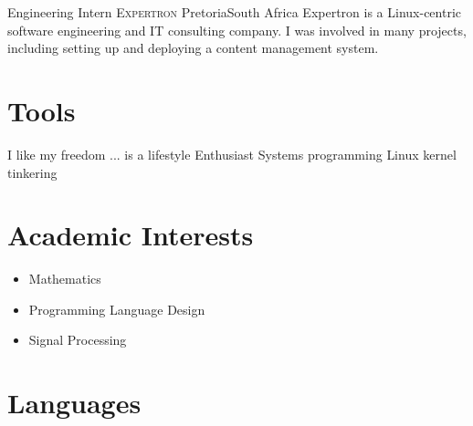 \documentclass[11pt,a4paper,sans]{moderncv}
\begin{document}
{Engineering Intern}
{\textsc{Expertron}}
{\newline Pretoria}{South Africa}
{Expertron is a Linux-centric software engineering and IT consulting company. I
was involved in many projects, including setting up and deploying a content
management system.}


\section{Tools}

{{\normalfont I like my freedom}}
{}
{{\normalfont ... is a lifestyle}}
{}
{{\normalfont Enthusiast}}
{}
{{\normalfont Systems programming}}
{}
{{\normalfont Linux kernel tinkering}}
{}


\section{Academic Interests}
\begin{itemize}
	\item Mathematics
	\item Programming Language Design
	\item Signal Processing
\end{itemize}


\section{Languages}
\end{document}
